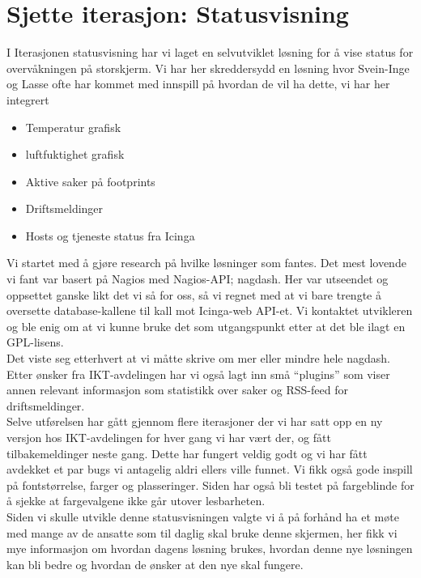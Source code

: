

\date{Fredag 12. April 2013}



\maketitle
\section*{Sjette iterasjon: Statusvisning}


\noindent I Iterasjonen statusvisning har vi laget en selvutviklet løsning for å vise status for overvåkningen på storskjerm. Vi har her skreddersydd en løsning hvor Svein-Inge og Lasse ofte har kommet med innspill på hvordan de vil ha dette, vi har her integrert\\

\begin{itemize}
	\item Temperatur grafisk
	\item luftfuktighet grafisk
	\item Aktive saker på footprints
	\item Driftsmeldinger
	\item Hosts og tjeneste status fra Icinga
\end{itemize}

\noindent Vi startet med å gjøre research på hvilke løsninger som fantes. Det mest lovende vi fant var basert på Nagios med Nagios-API; nagdash. Her var utseendet og oppsettet ganske likt det vi så for oss, så vi regnet med at vi bare trengte å oversette database-kallene til kall mot Icinga-web API-et. Vi kontaktet utvikleren og ble enig om at vi kunne bruke det som utgangspunkt etter at det ble ilagt en GPL-lisens.\\

\noindent Det viste seg etterhvert at vi måtte skrive om mer eller mindre hele nagdash. Etter ønsker fra IKT-avdelingen har vi også lagt inn små “plugins” som viser annen relevant informasjon som statistikk over saker og RSS-feed for driftsmeldinger.\\

\noindent Selve utførelsen har gått gjennom flere iterasjoner der vi har satt opp en ny versjon hos IKT-avdelingen for hver gang vi har vært der, og fått tilbakemeldinger neste gang. Dette har fungert veldig godt og vi har fått avdekket et par bugs vi antagelig aldri ellers ville funnet. Vi fikk også gode inspill på fontstørrelse, farger og plasseringer. Siden har også bli testet på fargeblinde for å sjekke at fargevalgene ikke går utover lesbarheten.\\

\noindent Siden vi skulle utvikle denne statusvisningen valgte vi å på forhånd ha et møte med mange av de ansatte som til daglig skal bruke denne skjermen, her fikk vi mye informasjon om hvordan dagens løsning brukes, hvordan denne nye løsningen kan bli bedre og hvordan de ønsker at den nye skal fungere.\\



